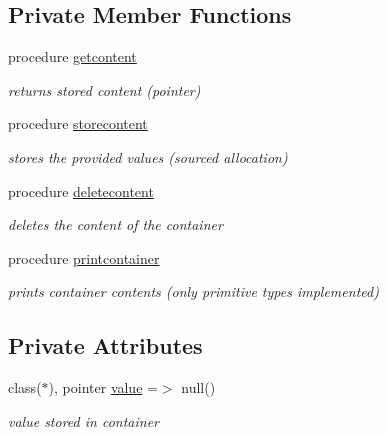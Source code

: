 \subsection*{Private Member Functions}
\begin{DoxyCompactItemize}
\item 
procedure \mbox{\hyperlink{structcontainer__mod_1_1container_abe1540dea98e715a935b91c662a2d81a}{getcontent}}
\begin{DoxyCompactList}\small\item\em returns stored content (pointer) \end{DoxyCompactList}\item 
procedure \mbox{\hyperlink{structcontainer__mod_1_1container_a15e46e6f457bb49604ccf191780f6638}{storecontent}}
\begin{DoxyCompactList}\small\item\em stores the provided values (sourced allocation) \end{DoxyCompactList}\item 
procedure \mbox{\hyperlink{structcontainer__mod_1_1container_a69d57b2b6fd0f7b337e438657df27653}{deletecontent}}
\begin{DoxyCompactList}\small\item\em deletes the content of the container \end{DoxyCompactList}\item 
procedure \mbox{\hyperlink{structcontainer__mod_1_1container_ac62ed00e4c79b7c758a5efbc9cc1909a}{printcontainer}}
\begin{DoxyCompactList}\small\item\em prints container contents (only primitive types implemented) \end{DoxyCompactList}\end{DoxyCompactItemize}
\subsection*{Private Attributes}
\begin{DoxyCompactItemize}
\item 
class($\ast$), pointer \mbox{\hyperlink{structcontainer__mod_1_1container_a297f4632156bf226aa8599a7f0cd55c0}{value}} =$>$ null()
\begin{DoxyCompactList}\small\item\em value stored in container \end{DoxyCompactList}\end{DoxyCompactItemize}


